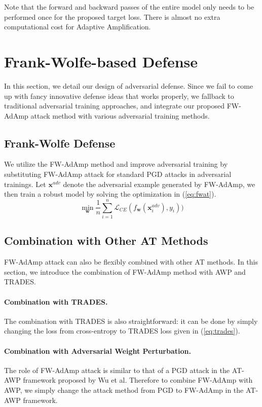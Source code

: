 \documentclass{article}
\begin{document}
        Note that the forward and backward passes of the entire model only needs to be performed once for the proposed target loss. There is almost no extra computational cost for Adaptive Amplification.

\section{Frank-Wolfe-based Defense}\label{sec:DefenseMethodology}
    In this section, we detail our design of adversarial defense. Since we fail to come up with fancy innovative defense ideas that works properly, we fallback to traditional adversarial training approaches, and integrate our proposed FW-AdAmp attack method with various adversarial training methods.

    \subsection{Frank-Wolfe Defense}
        We utilize the FW-AdAmp method and improve adversarial training by substituting FW-AdAmp attack for standard PGD attacks in adversarial trainings. Let $\mathbf{x}^{adv}$ denote the adversarial example generated by FW-AdAmp, we then train a robust model by solving the optimization in (\ref{eq:fwat}).
        \begin{equation}\label{eq:fwat}
            \min_{\mathbf{w}} \frac{1}{n}\sum_{i=1}^n \mathcal{L}_{CE}(f_{\mathbf{w}}(\mathbf{x}^{adv}_i), y_i))
        \end{equation}

    \subsection{Combination with Other AT Methods}
        FW-AdAmp attack can also be flexibly combined with other AT methods. In this section, we introduce the combination of FW-AdAmp method with AWP and TRADES.

        \paragraph{Combination with TRADES.} The combination with TRADES is also straightforward: it can be done by simply changing the loss from cross-entropy to TRADES loss given in (\ref{eq:trades}).

        \paragraph{Combination with Adversarial Weight Perturbation.} The role of FW-AdAmp attack is similar to that of a PGD attack in the AT-AWP framework proposed by Wu et al. Therefore to combine FW-AdAmp with AWP, we simply change the attack method from PGD to FW-AdAmp in the AT-AWP framework.
\end{document}
